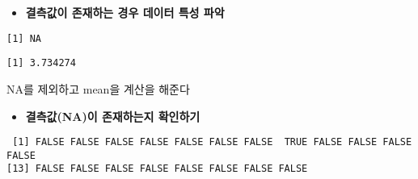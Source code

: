 \documentclass[
]{article}
\newenvironment{Shaded}{\begin{snugshade}}{\end{snugshade}}
\newcommand{\AttributeTok}[1]{\textcolor[rgb]{0.77,0.63,0.00}{#1}}
\newcommand{\CommentTok}[1]{\textcolor[rgb]{0.56,0.35,0.01}{\textit{#1}}}
\newcommand{\DecValTok}[1]{\textcolor[rgb]{0.00,0.00,0.81}{#1}}
\newcommand{\FunctionTok}[1]{\textcolor[rgb]{0.00,0.00,0.00}{#1}}
\newcommand{\NormalTok}[1]{#1}
\newcommand{\SpecialCharTok}[1]{\textcolor[rgb]{0.00,0.00,0.00}{#1}}
\providecommand{\tightlist}{%
  \setlength{\itemsep}{0pt}\setlength{\parskip}{0pt}}
\begin{document}
\begin{itemize}
\tightlist
\item
  \textbf{결측값이 존재하는 경우 데이터 특성 파악}
\end{itemize}

\begin{Shaded}
\end{Shaded}

\begin{verbatim}
[1] NA
\end{verbatim}

\begin{Shaded}
\end{Shaded}

\begin{verbatim}
[1] 3.734274
\end{verbatim}

NA를 제외하고 mean을 계산을 해준다

\begin{itemize}
\tightlist
\item
  \textbf{결측값(NA)이 존재하는지 확인하기}
\end{itemize}

\begin{Shaded}
\end{Shaded}

\begin{verbatim}
 [1] FALSE FALSE FALSE FALSE FALSE FALSE FALSE  TRUE FALSE FALSE FALSE FALSE
[13] FALSE FALSE FALSE FALSE FALSE FALSE FALSE FALSE
\end{verbatim}
\end{document}
